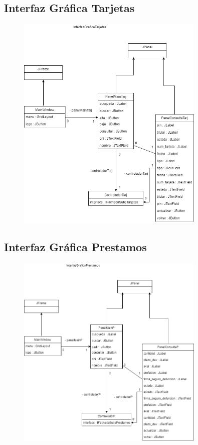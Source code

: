 \documentclass[12pt]{article}
\begin{document}
\subsection{Interfaz Gráfica Tarjetas}
\begin{figure}[H]
    \centering
    \includegraphics[width=0.8\textwidth]{IntefazGraficaTarjetas1.png}
\end{figure}

\subsection{Interfaz Gráfica Prestamos}
\begin{figure}[H]
    \centering
    \includegraphics[width=0.8\textwidth]{InterfazGraficaPrestamos_1.png}
\end{figure}
\end{document}
